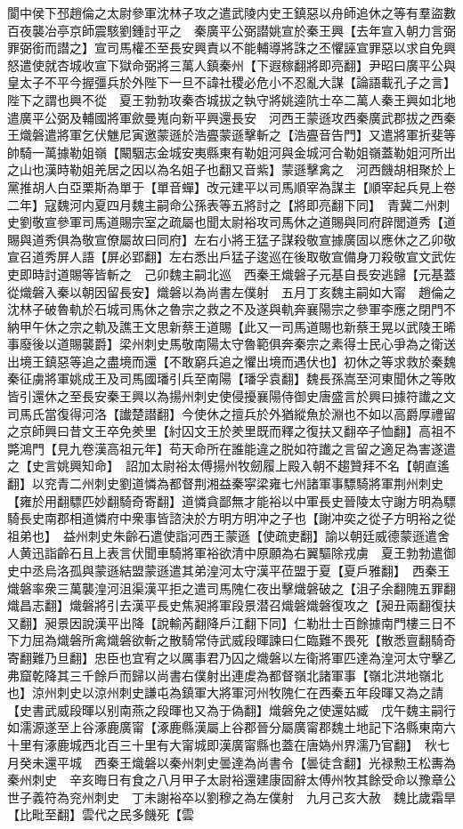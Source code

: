 閬中侯下邳趙倫之太尉參軍沈林子攻之遣武陵内史王鎮惡以舟師追休之等有羣盜數百夜襲冶亭京師震駭劉鍾討平之　秦廣平公弼譛姚宣於秦王興【去年宣入朝力言弼罪弼銜而譛之】宣司馬權丕至長安興責以不能輔導將誅之丕懼誣宣罪惡以求自免興怒遣使就杏城收宣下獄命弼將三萬人鎮秦州【下遐稼翻將即亮翻】尹昭曰廣平公與皇太子不平今握彊兵於外陛下一旦不諱社稷必危小不忍亂大謀【論語載孔子之言】陛下之謂也興不從　夏王勃勃攻秦杏城拔之執守將姚逵阬士卒二萬人秦王興如北地遣廣平公弼及輔國將軍歛曼嵬向新平興還長安　河西王蒙遜攻西秦廣武郡拔之西秦王熾磐遣將軍乞伏魋尼寅邀蒙遜於浩亹蒙遜擊斬之【浩亹音告門】又遣將軍折斐等帥騎一萬據勒姐嶺【闞駰志金城安夷縣東有勒姐河與金城河合勒姐嶺蓋勒姐河所出之山也漢時勒姐羌居之因以為名姐子也翻又音紫】蒙遜擊禽之　河西饑胡相聚於上黨推胡人白亞栗斯為單于【單音蟬】改元建平以司馬順宰為謀主【順宰起兵見上卷二年】寇魏河内夏四月魏主嗣命公孫表等五將討之【將即亮翻下同】　青冀二州刺史劉敬宣參軍司馬道賜宗室之疏屬也聞太尉裕攻司馬休之道賜與同府辟閭道秀【道賜與道秀俱為敬宣僚屬故曰同府】左右小將王猛子謀殺敬宣據廣固以應休之乙卯敬宣召道秀屏人語【屏必郢翻】左右悉出戶猛子逡巡在後取敬宣備身刀殺敬宣文武佐吏即時討道賜等皆斬之　己卯魏主嗣北巡　西秦王熾磐子元基自長安逃歸【元基蓋從熾磐入秦以朝因留長安】熾磐以為尚書左僕射　五月丁亥魏主嗣如大甯　趙倫之沈林子破魯軌於石城司馬休之魯宗之救之不及遂與軌奔襄陽宗之參軍李應之閉門不納甲午休之宗之軌及譙王文思新蔡王道賜【此又一司馬道賜也新蔡王晃以武陵王晞事廢後以道賜襲爵】梁州刺史馬敬南陽太守魯範俱奔秦宗之素得士民心爭為之衛送出境王鎮惡等追之盡境而還【不敢窮兵追之懼出境而遇伏也】初休之等求救於秦魏秦征虜將軍姚成王及司馬國璠引兵至南陽【璠孚袁翻】魏長孫嵩至河東聞休之等敗皆引還休之至長安秦王興以為揚州刺史使侵擾襄陽侍御史唐盛言於興曰據符䜟之文司馬氏當復得河洛【䜟楚譛翻】今使休之擅兵於外猶縱魚於淵也不如以高爵厚禮留之京師興曰昔文王卒免羑里【紂囚文王於羑里既而釋之復扶又翻卒子恤翻】高祖不斃鴻門【見九卷漢高祖元年】苟天命所在誰能違之脱如符䜟之言留之適足為害遂遣之【史言姚興知命】　詔加太尉裕太傅揚州牧劒履上殿入朝不趨贊拜不名【朝直遙翻】以兖青二州刺史劉道憐為都督荆湘益秦寜梁雍七州諸軍事驃騎將軍荆州刺史【雍於用翻驃匹妙翻騎奇寄翻】道憐貪鄙無才能裕以中軍長史晉陵太守謝方明為驃騎長史南郡相道憐府中衆事皆諮決於方明方明冲之子也【謝冲奕之從子方明裕之從祖弟也】　益州刺史朱齡石遣使詣河西王蒙遜【使疏吏翻】諭以朝廷威德蒙遜遣舍人黄迅詣齡石且上表言伏聞車騎將軍裕欲清中原願為右翼驅除戎虜　夏王勃勃遣御史中丞烏洛孤與蒙遜結盟蒙遜遣其弟湟河太守漢平莅盟于夏【夏戶雅翻】　西秦王熾磐率衆三萬襲湟河沮渠漢平拒之遣司馬隗仁夜出擊熾磐破之【沮子余翻隗五罪翻熾昌志翻】熾磐將引去漢平長史焦昶將軍段景潜召熾磐熾磐復攻之【昶丑兩翻復扶又翻】昶景因說漢平出降【說輸芮翻降戶江翻下同】仁勒壯士百餘據南門樓三日不下力屈為熾磐所禽熾磐欲斬之散騎常侍武威段暉諫曰仁臨難不畏死【散悉亶翻騎奇寄翻難乃旦翻】忠臣也宜宥之以厲事君乃囚之熾磐以左衛將軍匹達為湟河太守擊乙弗窟乾降其三千餘戶而歸以尚書右僕射出連䖍為都督嶺北諸軍事【嶺北洪地嶺北也】涼州刺史以涼州刺史謙屯為鎮軍大將軍河州牧隗仁在西秦五年段暉又為之請【史書武威段暉以别南燕之段暉也又為于偽翻】熾磐免之使還姑臧　戊午魏主嗣行如濡源遂至上谷涿鹿廣甯【涿鹿縣漢屬上谷郡晉分屬廣甯郡魏土地記下洛縣東南六十里有涿鹿城西北百三十里有大甯城即漢廣甯縣也蓋在唐媯州界濡乃官翻】　秋七月癸未還平城　西秦王熾磐以秦州刺史曇達為尚書令【曇徒含翻】光禄勲王松夀為秦州刺史　辛亥晦日有食之八月甲子太尉裕還建康固辭太傅州牧其餘受命以豫章公世子義符為兖州刺史　丁未謝裕卒以劉穆之為左僕射　九月己亥大赦　魏比歲霜旱【比毗至翻】雲代之民多饑死【雲
